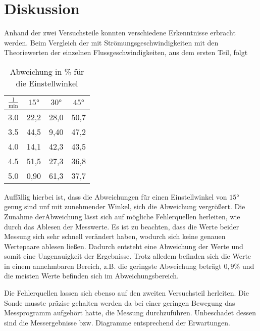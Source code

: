 \section{Diskussion}

\begin{flushleft}
    Anhand der zwei Versuchsteile konnten verschiedene Erkenntnisse erbracht werden. 
    Beim Vergleich der mit Strömungsgeschwindigkeiten mit den Theoriewerten der einzelnen Flussgeschwindigkeiten, aus dem ersten Teil, folgt
\end{flushleft}

\begin{table}
    \centering
    \caption{Abweichung in \% für die Einstellwinkel}
    \label{Tabelle}
    \begin{tabular} {c | c  c  c}
        \toprule
        {$ \frac{\text{l}}{\text{min}} $} &
        {$ 15\unit{\degree} $} &
        {$ 30\unit{\degree} $} &
        {$ 45\unit{\degree} $} \\
        \midrule
        3.0 & 22,2 & 28,0 & 50,7 \\
        3.5 & 44,5 & 9,40 & 47,2 \\
        4.0 & 14,1 & 42,3 & 43,5 \\
        4.5 & 51,5 & 27,3 & 36,8 \\
        5.0 & 0,90 & 61,3 & 37,7 \\
    \end{tabular}  
\end{table}

\begin{flushleft}
    Auffällig hierbei ist, dass die Abweichungen für einen Einstellwinkel von $15\unit{\degree}$ genug sind unf mit zunehmender Winkel, sich die Abweichung vergrößert.
    Die Zunahme derAbweichung lässt sich auf mögliche Fehlerquellen herleiten, wie durch das Ablesen der Messwerte.
    Es ist zu beachten, dass die Werte beider Messung sich sehr schnell verändert haben, wodurch sich keine genauen Wertepaare ablesen ließen.
    Dadurch entsteht eine Abweichung der Werte und somit eine Ungenauigkeit der Ergebnisse.
    Trotz alledem befinden sich die Werte in einem annehmbaren Bereich, z.B. die geringste Abweichung beträgt $0,9\%$
    und die meisten Werte befinden sich im Abweichungsbereich.
\end{flushleft}

\begin{flushleft}
    Die Fehlerquellen lassen sich ebenso auf den zweiten Versuchsteil herleiten.
    Die Sonde musste präzise gehalten werden da bei einer geringen Bewegung das Messprogramm aufgehört hatte, die Messung durchzuführen.
    Unbeschadet dessen sind die Messergebnisse bzw. Diagramme entsprechend der Erwartungen.
\end{flushleft} 